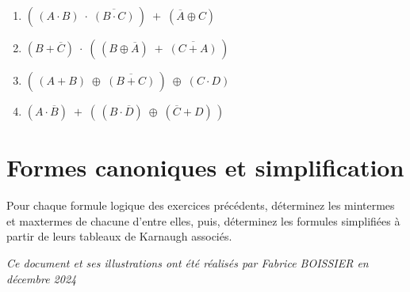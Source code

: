 \documentclass[11pt,a4paper]{article}
\begin{document}
\medskip

\begin{center}
\begin{table}[ht!]
  \centering
  \begin{minipage}{0.50\textwidth}

\begin{enumerate}
  \item $ ( \, (A \cdot B) \; \cdot \; \overline{(B \cdot C)} \, ) \; + \; (\overline{A} \oplus C) $
  \medskip
  \item $ (B + \overline{C}) \; \cdot \;  ( \, (B \oplus \overline{A}) \; + \; \overline{(C + A)} \, ) $
\end{enumerate}

  \end{minipage}
  \hfillx
  \begin{minipage}{0.50\textwidth}

\begin{enumerate}
  \setcounter{enumi}{2}
  \item $ ( \, (A + B) \; \oplus \; \overline{(B + C)} \, ) \; \oplus \; (C \cdot D) $
  \medskip
  \item $ (A \cdot \overline{B}) \; + \;  ( \, (B \cdot \overline{D}) \; \oplus \; (\overline{C} + D) \, ) $
\end{enumerate}

  \end{minipage}
\end{table}
\end{center}




\section{Formes canoniques et simplification}

\medskip

Pour chaque formule logique des exercices précédents, déterminez les mintermes et maxtermes de chacune d'entre elles, puis, déterminez les formules simplifiées à partir de leurs tableaux de Karnaugh associés.


\bigskip


\bigskip

\vfillFirst

\vfillLast

\begin{center}
\textit{Ce document et ses illustrations ont été réalisés par Fabrice BOISSIER en décembre 2024}

\end{center}
\end{document}
